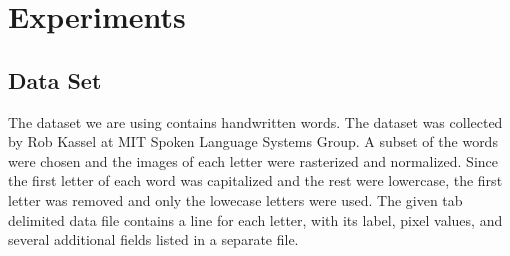 \documentclass{article} %
\begin{document}
\section{Experiments}
\subsection{Data Set}
The dataset we are using contains handwritten words. The dataset was collected by Rob Kassel at MIT Spoken Language Systems Group. A subset of the words were chosen and the images of each letter were rasterized and normalized. Since the first letter of each word was capitalized and the rest were lowercase, the first letter was removed and only the lowecase letters were used. The given tab delimited data file  contains a line for each letter, with its label, pixel values, and several additional fields listed in a separate file. 
\end{document}
